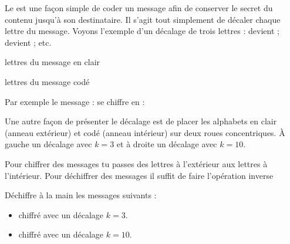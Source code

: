 \documentclass[11pt,class=report,crop=false]{standalone}
\begin{document}
\begin{cours}


Le  est une façon simple de coder un message afin de conserver le secret du contenu jusqu'à son destinataire. Il s'agit tout simplement de décaler chaque lettre du message. Voyons l'exemple d'un décalage de trois lettres :  devient  ; 
devient  ; etc.

\begin{center}
\begin{minipage}{0.9\textwidth}
 \qquad lettres du message en clair

 \qquad lettres du message codé
\end{minipage}
\end{center}

Par exemple le message :
se chiffre en :

Une autre façon de présenter le décalage est de placer les alphabets en clair (anneau extérieur) et codé (anneau intérieur) sur deux roues concentriques. À gauche un décalage avec $k=3$ et à droite un décalage avec $k=10$.

Pour chiffrer des messages tu passes des lettres à l'extérieur aux lettres à l'intérieur.
Pour déchiffrer des messages il suffit de faire l'opération inverse

Déchiffre à la main les messages suivants :
\begin{itemize}
  \item {} chiffré avec un décalage $k=3$.

  \item {} chiffré avec un décalage $k=10$. 
 
\end{itemize}  

\end{cours}
\end{document}
